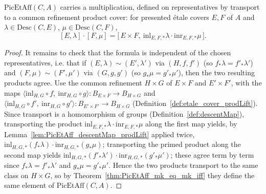 \begin{theorem}[Multiplication]
  \label{thm:PicEtAff_mk_mul_mk}
  \leanok
  \(\mathrm{PicEtAff}(C,A)\) carries a multiplication, defined on representatives by transport
  to a common refinement product cover: for presented \'etale covers \(E, F\) of \(A\) and
  \(\lambda \in \mathrm{Desc}(C,E)\), \(\mu \in \mathrm{Desc}(C,F)\),
  \[
    [E,\lambda] \cdot [F,\mu] = \bigl[\,E \times F,\ \mathrm{inl}_{E,F,*}\lambda \cdot
    \mathrm{inr}_{E,F,*}\mu\,\bigr].
  \]
\end{theorem}
\begin{proof}
  \leanok
  It remains to check that the formula is independent of the chosen representatives, i.e. that
  if \((E,\lambda) \sim (E',\lambda')\) via \((H,f,f')\) (so \(f_{*}\lambda = f'_{*}\lambda'\))
  and \((F,\mu) \sim (F',\mu')\) via \((G,g,g')\) (so \(g_{*}\mu = g'_{*}\mu'\)), then the two
  resulting products agree. Use the common refinement \(H \times G\) of \(E \times F\) and
  \(E' \times F'\), with the maps
  \(\langle \mathrm{inl}_{H,G} \circ f,\ \mathrm{inr}_{H,G} \circ g\rangle \colon B_{E \times F}
  \to B_{H \times G}\) and
  \(\langle \mathrm{inl}_{H,G} \circ f',\ \mathrm{inr}_{H,G} \circ g'\rangle \colon
  B_{E' \times F'} \to B_{H \times G}\)
  (Definition~\ref{def:etale_cover_prodLift}). Since transport is a homomorphism of groups
  (Definition~\ref{def:descentMap}), transporting the product
  \(\mathrm{inl}_{E,F,*}\lambda \cdot \mathrm{inr}_{E,F,*}\mu\) along the first map yields, by
  Lemma~\ref{lem:PicEtAff_descentMap_prodLift} applied twice,
  \(\mathrm{inl}_{H,G,*}(f_{*}\lambda) \cdot \mathrm{inr}_{H,G,*}(g_{*}\mu)\); transporting the
  primed product along the second map yields
  \(\mathrm{inl}_{H,G,*}(f'_{*}\lambda') \cdot \mathrm{inr}_{H,G,*}(g'_{*}\mu')\); these agree
  term by term since \(f_{*}\lambda = f'_{*}\lambda'\) and \(g_{*}\mu = g'_{*}\mu'\). Hence the
  two products transport to the same class on \(H \times G\), so by
  Theorem~\ref{thm:PicEtAff_mk_eq_mk_iff} they define the same element of
  \(\mathrm{PicEtAff}(C,A)\).
\end{proof}

